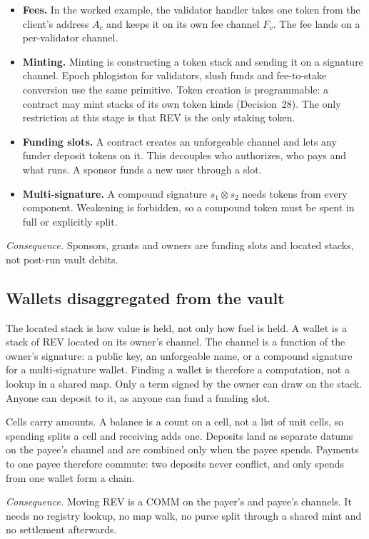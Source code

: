 \documentclass[11pt]{article}
\begin{document}
\begin{itemize}
\item \textbf{Fees.} In the worked example, the validator handler takes one token from the client's address $A_c$ and keeps it on its own fee channel $F_v$. The fee lands on a per-validator channel.
\item \textbf{Minting.} Minting is constructing a token stack and sending it on a signature channel. Epoch phlogiston for validators, slush funds and fee-to-stake conversion use the same primitive. Token creation is programmable: a contract may mint stacks of its own token kinds (Decision~28). The only restriction at this stage is that REV is the only staking token.
\item \textbf{Funding slots.} A contract creates an unforgeable channel and lets any funder deposit tokens on it. This decouples who authorizes, who pays and what runs. A sponsor funds a new user through a slot.
\item \textbf{Multi-signature.} A compound signature $s_1 \otimes s_2$ needs tokens from every component. Weakening is forbidden, so a compound token must be spent in full or explicitly split.
\end{itemize}

\emph{Consequence.} Sponsors, grants and owners are funding slots and located stacks, not post-run vault debits.

\subsection{Wallets disaggregated from the vault}

The located stack is how value is held, not only how fuel is held. A wallet is a stack of REV located on its owner's channel. The channel is a function of the owner's signature: a public key, an unforgeable name, or a compound signature for a multi-signature wallet. Finding a wallet is therefore a computation, not a lookup in a shared map. Only a term signed by the owner can draw on the stack. Anyone can deposit to it, as anyone can fund a funding slot.

Cells carry amounts. A balance is a count on a cell, not a list of unit cells, so spending splits a cell and receiving adds one. Deposits land as separate datums on the payee's channel and are combined only when the payee spends. Payments to one payee therefore commute: two deposits never conflict, and only spends from one wallet form a chain.

\emph{Consequence.} Moving REV is a COMM on the payer's and payee's channels. It needs no registry lookup, no map walk, no purse split through a shared mint and no settlement afterwards.
\end{document}
